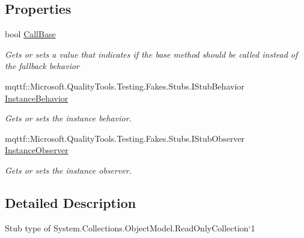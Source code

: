 \subsection*{Properties}
\begin{DoxyCompactItemize}
\item 
bool \hyperlink{class_system_1_1_collections_1_1_object_model_1_1_fakes_1_1_stub_read_only_collection_3_01_t_01_4_aec1e6a8ead71ba442e8a28044daa8bfe}{Call\-Base}
\begin{DoxyCompactList}\small\item\em Gets or sets a value that indicates if the base method should be called instead of the fallback behavior\end{DoxyCompactList}\item 
mqttf\-::\-Microsoft.\-Quality\-Tools.\-Testing.\-Fakes.\-Stubs.\-I\-Stub\-Behavior \hyperlink{class_system_1_1_collections_1_1_object_model_1_1_fakes_1_1_stub_read_only_collection_3_01_t_01_4_ae43d07c5cca31ebc751bc6c4a55e9563}{Instance\-Behavior}
\begin{DoxyCompactList}\small\item\em Gets or sets the instance behavior.\end{DoxyCompactList}\item 
mqttf\-::\-Microsoft.\-Quality\-Tools.\-Testing.\-Fakes.\-Stubs.\-I\-Stub\-Observer \hyperlink{class_system_1_1_collections_1_1_object_model_1_1_fakes_1_1_stub_read_only_collection_3_01_t_01_4_a6b64e20e7eca848d29fd1c34fcdbeb0c}{Instance\-Observer}
\begin{DoxyCompactList}\small\item\em Gets or sets the instance observer.\end{DoxyCompactList}\end{DoxyCompactItemize}


\subsection{Detailed Description}
Stub type of System.\-Collections.\-Object\-Model.\-Read\-Only\-Collection`1



